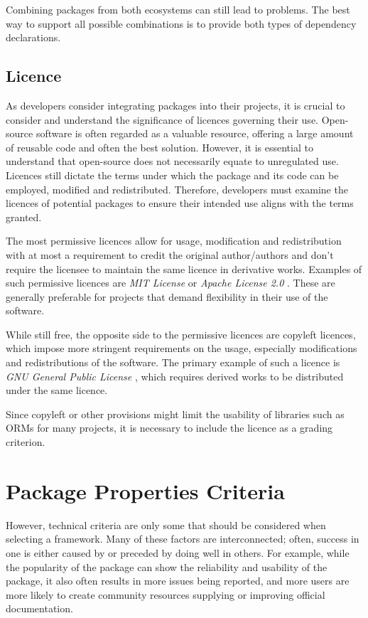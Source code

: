 Combining packages from both ecosystems can still lead to problems. The best way
to support all possible combinations is to provide both types of dependency
declarations.

\subsection{Licence}
As developers consider integrating packages into their projects, it is crucial
to consider and understand the significance of licences governing their use.
Open-source software is often regarded as a valuable resource, offering a large
amount of reusable code and often the best solution. However, it is essential to
understand that open-source does not necessarily equate to unregulated use.
Licences still dictate the terms under which the package and its code can be
employed, modified and redistributed. Therefore, developers must examine the
licences of potential packages to ensure their intended use aligns with the
terms granted.

The most permissive licences allow for usage, modification and redistribution
with at most a requirement to credit the original author/authors and don't
require the licensee to maintain the same licence in derivative works. Examples
of such permissive licences are \textit{MIT License} \cite{MITLicense} or
\textit{Apache License 2.0} \cite{ApacheLicense2}. These are generally preferable
for projects that demand flexibility in their use of the software.

While still free, the opposite side to the permissive licences are copyleft
licences, which impose more stringent requirements on the usage, especially
modifications and redistributions of the software. The primary example of such a
licence is \textit{GNU General Public License} \cite{GNUGPL}, which requires
derived works to be distributed under the same licence.

Since copyleft or other provisions might limit the usability of libraries such
as ORMs for many projects, it is necessary to include the licence as a grading
criterion.

\section{Package Properties Criteria}

However, technical criteria are only some that should be considered when
selecting a framework. Many of these factors are interconnected; often, success
in one is either caused by or preceded by doing well in others. For example,
while the popularity of the package can show the reliability and usability of
the package, it also often results in more issues being reported, and more
users are more likely to create community resources supplying or improving
official documentation.

